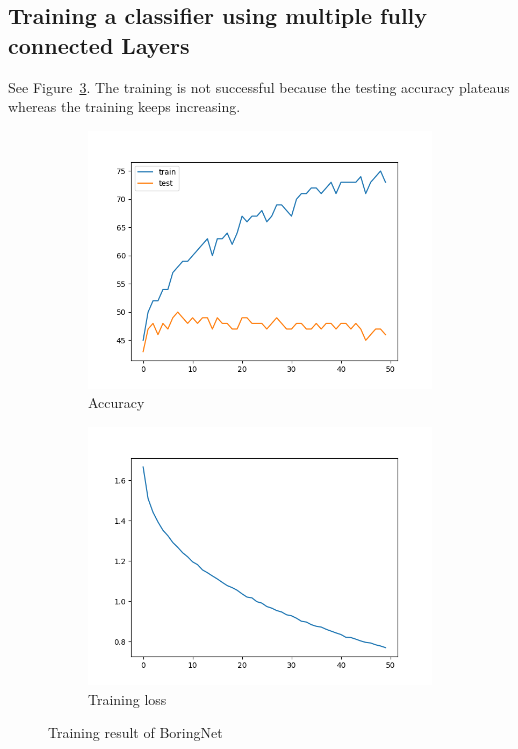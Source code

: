 \documentclass[12pt]{article}
\begin{document}
\subsection{Training a classifier using multiple fully connected Layers}
See Figure~\ref{fig:2_2}. The training is not successful because the testing accuracy plateaus whereas the training keeps increasing.
\begin{figure}
  \centering
  \begin{subfigure}{.5\textwidth}
    \centering
    \includegraphics[width=.8\linewidth]{accuracies_2_2.png}
    \caption{Accuracy}
    \label{fig:2_2_sub1}
  \end{subfigure}%
  \begin{subfigure}{.5\textwidth}
    \centering
    \includegraphics[width=.8\linewidth]{loss_2_2.png}
    \caption{Training loss}
    \label{fig:2_2_sub2}
  \end{subfigure}
  \caption{Training result of BoringNet}
  \label{fig:2_2}
\end{figure}
\end{document}
